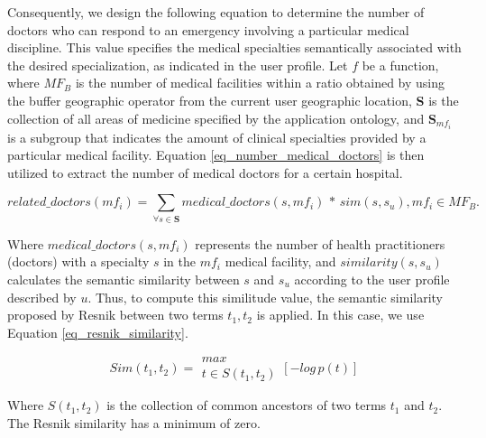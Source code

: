 \documentclass[sustainability,article,submit,pdftex,moreauthors]{Definitions/mdpi}
\begin{document}
Consequently, we design the following equation to determine the number of doctors who can respond to an emergency involving a particular medical discipline. This value specifies the medical specialties semantically associated with the desired specialization, as indicated in the user profile. Let $f$ be a function, where $MF_B$ is the number of medical facilities within a ratio obtained by using the buffer geographic operator from the current user geographic location, \textbf{S} is the collection of all areas of medicine specified by the application ontology, and $\textbf{S}_{mf_{i}}$ is a subgroup that indicates the amount of clinical specialties provided by a particular medical facility. Equation \ref{eq_number_medical_doctors} is then utilized to extract the number of medical doctors for a certain hospital.
\begin{center}
\begin{equation}
related\_doctors(mf_{i}) = \sum_{\forall s \in \textbf{S}}medical\_doctors(s, mf_{i})\,\ast\,sim(s, s_u),mf_{i} \in MF_{B}. 
\label{eq_number_medical_doctors}
\end{equation}
\end{center}
 
Where $medical\_doctors(s, mf_{i})$ represents the number of health practitioners (doctors) with a specialty $s$ in the $mf_{i}$ medical facility, and $similarity(s, s_u)$ calculates the semantic similarity between $s$ and $s_u$ according to the user profile described by $u$. Thus, to compute this similitude value, the semantic similarity proposed by Resnik \cite{resnik2011semantic} between two terms $t_1, t_2$ is applied. In this case, we use Equation \ref{eq_resnik_similarity}. 
\begin{center}
\begin{equation}
Sim(t_1, t_2) =  \begin{matrix}{max} \\ {t \in S(t_1, t_2)}\end{matrix}  [-log \, p(t)]  
\label{eq_resnik_similarity}
\end{equation}
\end{center}

Where $S(t_1, t_2)$ is the collection of common ancestors of two terms $t_1$ and $t_2$. The Resnik similarity has a minimum of zero.
\end{document}
